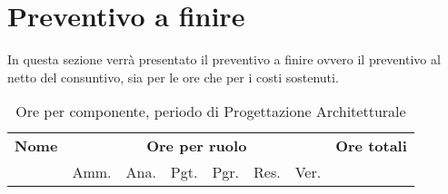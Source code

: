 \section{Preventivo a finire}

In questa sezione verrà presentato il preventivo a finire ovvero il preventivo al netto del consuntivo, sia per le ore che per i costi sostenuti.

\label{consuntivo}
\begin{table}[H]
\begin{tabular}{lccccccc}
\toprule
    \textbf{Nome}  & \multicolumn{6}{c}{\textbf{Ore per ruolo}} & \textbf{Ore totali} \\
     & Amm. & Ana. & Pgt. & Pgr. & Res. & Ver. & \\
    \midrule
    
    	
    
    \bottomrule
\end{tabular}
\caption{Ore per componente, periodo di Progettazione Architetturale}
\end{table}
